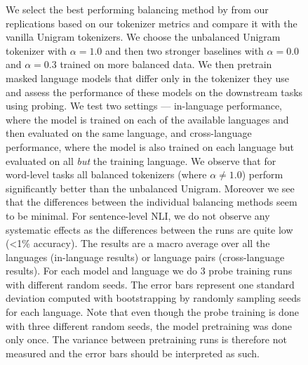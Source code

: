 \begin{figure}
\begin{subfigure}{.5\textwidth}
    \end{subfigure}
    \caption{We select the best performing balancing method by \citet{chung_improving_2020} from our replications based on our tokenizer metrics and compare it with the vanilla Unigram tokenizers. We choose the unbalanced Unigram tokenizer with $\alpha=1.0$ and then two stronger baselines with $\alpha=0.0$ and $\alpha=0.3$ trained on more balanced data. We then pretrain masked language models that differ only in the tokenizer they use and assess the performance of these models on the downstream tasks using probing. We test two settings --- in-language performance, where the model is trained on each of the available languages and then evaluated on the same language, and cross-language performance, where the model is also trained on each language but evaluated on all \textit{but} the training language. We observe that for word-level tasks all balanced tokenizers (where $\alpha\neq1.0$) perform significantly better than the unbalanced Unigram. Moreover we see that the differences between the individual balancing methods seem to be minimal. For sentence-level NLI, we do not observe any systematic effects as the differences between the runs are quite low (<1\% accuracy).
    The results are a macro average over all the languages (in-language results) or language pairs (cross-language results). For each model and language we do 3 probe training runs with different random seeds. The error bars represent one standard deviation computed with bootstrapping by randomly sampling seeds for each language. Note that even though the probe training is done with three different random seeds, the model pretraining was done only once. The variance between pretraining runs is therefore not measured and the error bars should be interpreted as such.}
    \label{fig:probe_overall}
\end{figure}



